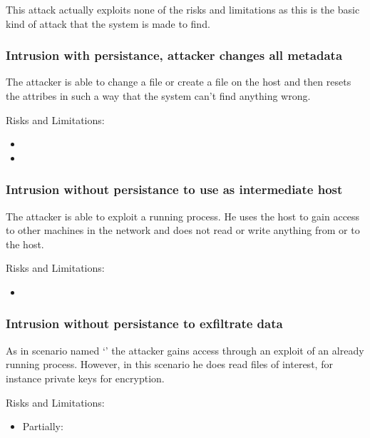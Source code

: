 \documentclass[
	a4paper,					%
	10pt,							%
	twoside,					%
	openright,				%
	notitlepage,			%
	parskip=half,			%
]{scrreprt}					%
\begin{document}
This attack actually exploits none of the risks and limitations as this is the basic kind of attack that the system is made to find. 

\subsubsection{Intrusion with persistance, attacker changes all metadata}
\label{sec:attack:changeattr}

The attacker is able to change a file or create a file on the host and then resets the attribes in such a way that the system can't find anything wrong.

Risks and Limitations:
\begin{itemize}
	\item {}
	\item {}
\end{itemize}

\subsubsection{Intrusion without persistance to use as intermediate host}
\label{sec:attack:nopersistanceintermediatehost}

The attacker is able to exploit a running process. He uses the host to gain access to other machines in the network and does not read or write anything from or to the host. 

Risks and Limitations:
\begin{itemize}
	\item {}
\end{itemize}

\subsubsection{Intrusion without persistance to exfiltrate data}
\label{sec:attack:nopersistanceexfiltration}

As in scenario named `' the attacker gains access through an exploit of an already running process. However, in this scenario he does read files of interest, for instance private keys for encryption. 

Risks and Limitations:
\begin{itemize}
	\item Partially: 
\end{itemize}
\end{document}
